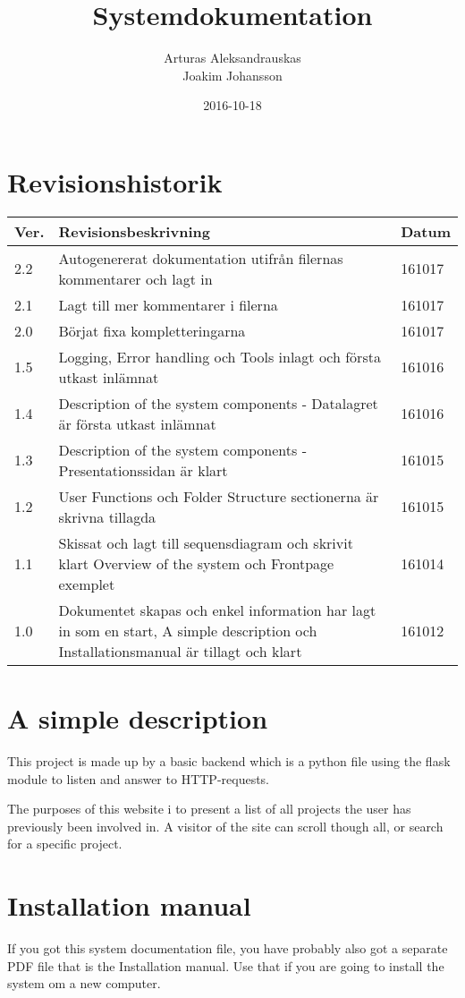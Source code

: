\documentclass{TDP003mall}
\author{Arturas Aleksandrauskas\\
  Joakim Johansson}
\title{Systemdokumentation}
\date{2016-10-18}
\begin{document}
\projectpage

\tableofcontents

\newpage
\section{Revisionshistorik}
\begin{table}[!h]
\begin{tabularx}{\linewidth}{|l|X|l|}
\hline
Ver. & Revisionsbeskrivning & Datum \\\hline
2.2 & Autogenererat dokumentation utifrån filernas kommentarer och lagt in & 161017 \\\hline
2.1 & Lagt till mer kommentarer i filerna & 161017 \\\hline
2.0 & Börjat fixa kompletteringarna & 161017 \\\hline
1.5 & Logging, Error handling och Tools inlagt och första utkast inlämnat & 161016 \\\hline
1.4 & Description of the system components - Datalagret är första utkast inlämnat & 161016 \\\hline
1.3 & Description of the system components - Presentationssidan är klart & 161015 \\\hline
1.2 & User Functions och Folder Structure sectionerna är skrivna tillagda & 161015 \\\hline
1.1 & Skissat och lagt till sequensdiagram och skrivit klart Overview of the system och Frontpage exemplet & 161014 \\\hline
1.0 & Dokumentet skapas och enkel information har lagt in som en start, A simple description och Installationsmanual är tillagt och klart & 161012 \\\hline
\end{tabularx}
\end{table}

\section{A simple description}
This project is made up by a basic backend which is a python file using the flask module to listen and answer to HTTP-requests.

The purposes of this website i to present a list of all projects the user has previously been involved in. A visitor of the site can scroll though all, or search for a specific project.\\

\section{Installation manual}
If you got this system documentation file, you have probably also got a separate PDF file that is the Installation manual. Use that if you are going to install the system om a new computer.\\
\end{document}
